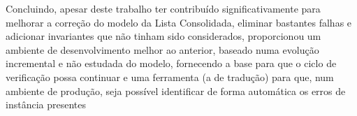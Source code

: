 \documentclass[tikz,runningheads,a4paper]{llncs}
\begin{document}
Concluindo, apesar deste trabalho ter contribuído significativamente para melhorar a correção do modelo da Lista Consolidada, eliminar bastantes falhas e adicionar invariantes que não tinham sido considerados, proporcionou um ambiente de desenvolvimento melhor ao anterior, baseado numa evolução incremental e não estudada do modelo, fornecendo a base para que o ciclo de verificação possa continuar e uma ferramenta (a de tradução) para que, num ambiente de produção, seja possível identificar de forma automática os erros de instância presentes

%
%
%
% 
% 
%

{}

\newpage
\end{document}
